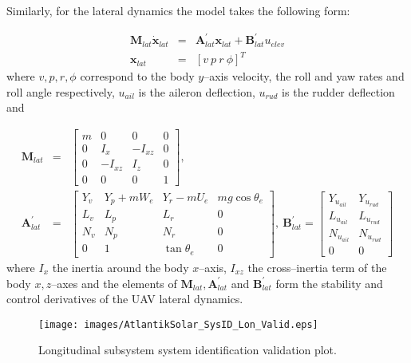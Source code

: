 Similarly, for the lateral dynamics the model takes the following form:


\small
\begin{eqnarray}\label{LAT_DYN}
 \mathbf{M}_{lat}\dot{\mathbf{x}}_{lat} &=& \mathbf{A}^\prime_{lat}\mathbf{x}_{lat}+\mathbf{B}^\prime_{lat}u_{elev} \\ \nonumber
 \mathbf{x}_{lat} &=& \left[v~p~r~\phi \right]^T
\end{eqnarray}
\normalsize
where $v,p,r,\phi$ correspond to the body $y$--axis velocity, the roll and yaw rates and roll angle respectively, $u_{ail}$ is the aileron deflection, $u_{rud}$ is the rudder deflection and

\scriptsize
\begin{eqnarray}
\mathbf{M}_{lat} &=& \begin{bmatrix}
m & 0 & 0 & 0\\ 
0 & I_x & -I_{xz} & 0\\ 
0 & -I_{xz} & I_z & 0\\ 
0 & 0 & 0 & 1
\end{bmatrix},\\ \nonumber 
\mathbf{A}^\prime_{lat} &=& \begin{bmatrix}
Y_v & Y_p + mW_e & Y_r-mU_e & mg\cos\theta_e\\ 
L_v & L_p & L_r & 0\\ 
N_v & N_p & N_r & 0 \\ 
0 & 1 & \tan\theta_e & 0
\end{bmatrix},~ \mathbf{B}^\prime_{lat} = \begin{bmatrix}
Y_{u_{ail}} & Y_{u_{rud}}\\ 
L_{u_{ail}} & L_{u_{rud}}\\ 
N_{u_{ail}} & N_{u_{rud}}\\ 
0 & 0
\end{bmatrix}
\end{eqnarray}
\normalsize
where $I_x$ the inertia around the body $x$--axis, $I_{xz}$ the cross--inertia term of the body $x,z$--axes and the elements of $\mathbf{M}_{lat},\mathbf{A}^\prime_{lat}$ and $\mathbf{B}^\prime_{lat}$ form the stability and control derivatives of the UAV lateral dynamics. 

%
\begin{figure}[htbp]
\centering
  \texttt{[image: images/AtlantikSolar\_SysID\_Lon\_Valid.eps]}
\caption{Longitudinal subsystem system identification validation plot. }
\label{SysID_LonValid}
\end{figure}
% 